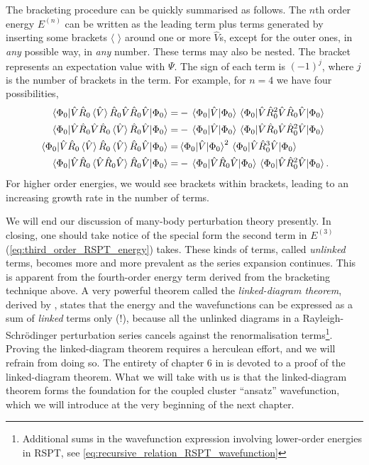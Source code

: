 The bracketing procedure can be quickly summarised as follows. The $n$th order 
energy $E^{(n)}$ can be written as the leading term plus terms generated by inserting 
some brackets $\langle$ $\rangle$ around one or more $\hat{V}$s, except for the outer 
ones, in \emph{any} possible way, in \emph{any} number. These terms may also be nested.
The bracket represents an expectation value with $\Psi$. The sign of each term is 
$(-1)^j$, where $j$ is the number of brackets in the term. 
For example, for $n=4$ we have four possibilities,
\begin{align}
    \mel{\Phi_0}{\hat{V}\hat{R}_0\ev*{\hat{V}}\hat{R}_0\hat{V}\hat{R}_0\hat{V}}{\Phi_0}
        =& - \mel{\Phi_0}{\hat{V}}{\Phi_0}
            \mel{\Phi_0}{\hat{V}\hat{R}_0^2\hat{V}\hat{R}_0\hat{V}}{\Phi_0} \\
    \mel{\Phi_0}{\hat{V}\hat{R}_0\hat{V}\hat{R}_0\ev*{\hat{V}}\hat{R}_0\hat{V}}{\Phi_0}
        =& - \mel{\Phi_0}{\hat{V}}{\Phi_0}
            \mel{\Phi_0}{\hat{V}\hat{R}_0\hat{V}\hat{R}_0^2\hat{V}}{\Phi_0} \\
    \mel{\Phi_0}{\hat{V}\hat{R}_0\ev*{\hat{V}}\hat{R}_0\ev*{\hat{V}}\hat{R}_0\hat{V}}{\Phi_0}
        =&  \mel{\Phi_0}{\hat{V}}{\Phi_0}^2
            \mel{\Phi_0}{\hat{V}\hat{R}_0^3\hat{V}}{\Phi_0} \\
    \mel{\Phi_0}{\hat{V}\hat{R}_0\ev*{\hat{V}\hat{R}_0\hat{V}}\hat{R}_0\hat{V}}{\Phi_0}
        =& - \mel{\Phi_0}{\hat{V}\hat{R}_0\hat{V}}{\Phi_0}
            \mel{\Phi_0}{\hat{V}\hat{R}_0^2\hat{V}}{\Phi_0}.
\end{align}
For higher order energies, we would see brackets within brackets, leading to an increasing 
growth rate in the number of terms.

We will end our discussion of many-body perturbation theory presently. In closing, 
one should take notice of the special form the second term in $E^{(3)}$
(\autoref{eq:third_order_RSPT_energy}) takes. These kinds of terms, called \emph{unlinked} terms, 
becomes more and more prevalent as the series expansion continues. This is apparent from 
the fourth-order energy term derived from the bracketing technique above. A very powerful theorem 
called the \emph{linked-diagram theorem}, derived by
\citeauthor{goldstone1957derivation}\cite{goldstone1957derivation}, states that the 
energy and the wavefunctions can be expressed as a sum of \emph{linked} terms only (!),
because all the 
unlinked diagrams in a Rayleigh-Schrödinger perturbation series cancels against the 
renormalisation terms\footnote{Additional sums in the  wavefunction expression 
involving lower-order energies in RSPT,
see \autoref{eq:recursive_relation_RSPT_wavefunction}}. Proving the linked-diagram 
theorem requires a herculean effort, and we will refrain from doing so. The entirety 
of chapter 6 in \citeauthor{shavitt2009many}\cite{shavitt2009many} is devoted to 
a proof of the linked-diagram theorem. What we will take with us is that the linked-diagram
theorem forms the foundation for the 
coupled cluster ``ansatz'' wavefunction, which we will introduce at the very beginning 
of the next chapter.
